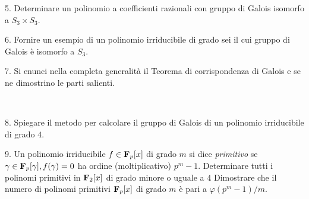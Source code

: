 \item{5.} Determinare un polinomio a coefficienti razionali con gruppo di Galois isomorfo a  $S_3\times S_{3}$.
\ve\ \vs

\item{6.} Fornire un esempio di un polinomio irriducibile di grado sei il cui gruppo di Galois \`e isomorfo a $S_3$.

\vv \item{7.} Si enunci nella completa generalit\`a il Teorema di
corrispondenza di Galois e se ne dimostrino le parti salienti.

\ve\ \vs


\item{8.} Spiegare il metodo per calcolare il gruppo di Galois di un polinomio irriducibile di grado $4$.\vv

\item{9.} Un polinomio irriducibile $f\in{\bf F}_p[x]$ di grado $m$ si dice {\it primitivo} se $\gamma\in{\bf F}_p[\gamma], f(\gamma)=0$ ha ordine (moltiplicativo) $p^m-1$.
 Determinare tutti i polinomi primitivi in ${\bf F}_2[x]$ di grado minore o uguale a $4$
 Dimostrare che il numero di polinomi primitivi ${\bf F}_p[x]$ di grado $m$ \`e pari a $\varphi(p^m-1)/m$.
\ \vst

\bye
